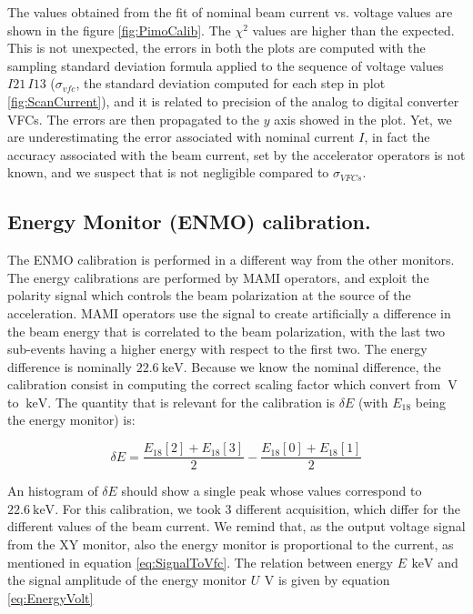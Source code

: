 The values obtained from the fit of nominal beam current vs. voltage values are shown in the figure \ref{fig:PimoCalib}. The $\chi^{2}$ values are higher than the expected. This is not unexpected, the errors in both the plots are computed with the sampling standard deviation formula applied to the sequence of voltage values $I21 \, I13$ ($\sigma_{vfc}$, the standard deviation computed for each step in plot \ref{fig:ScanCurrent}), and it is related to precision of the analog to digital converter VFCs. The errors are then propagated to the $y$ axis showed in the plot. 
Yet, we are underestimating the error associated with nominal current $I$, in fact the accuracy associated with the beam current, set by the accelerator operators is not known, and we suspect that is not negligible compared to $\sigma_{VFCs}$.

\subsection{Energy Monitor (ENMO) calibration.} 

The ENMO calibration is performed in a different way from the other monitors. The energy calibrations are performed by MAMI operators, and exploit the polarity signal which controls the beam polarization at the source of the acceleration. MAMI operators use the signal to create artificially a difference in the beam energy that is correlated to the beam polarization, with the last two sub-events having a higher energy with respect to the first two. The energy difference is nominally $\SI{22.6}{\kilo \electronvolt}$. Because we know the nominal difference, the calibration consist in computing the correct scaling factor which convert from $\SI{}{\volt}$ to $\SI{}{\kilo \electronvolt}$. The quantity that is relevant for the calibration is $\delta E$ (with $E_{18}$ being the energy monitor) is:

\begin{equation*}
\delta E = \frac{E_{18}[2] + E_{18}[3]}{2} - \frac{E_{18}[0] + E_{18}[1]}{2} 
\end{equation*}

An histogram of $\delta E$ should show a single peak whose values correspond to $\SI{22.6}{\kilo \electronvolt}$.
For this calibration, we took 3 different acquisition, which differ for the different values of the beam current. We remind that, as the output voltage signal from the XY monitor, also the energy monitor is proportional to the current, as mentioned in equation \ref{eq:SignalToVfc}. The relation between energy $E \, \SI{}{\kilo \electronvolt}$ and the signal amplitude of the energy monitor $U \, \SI{}{\volt}$ is given by equation \ref{eq:EnergyVolt}

